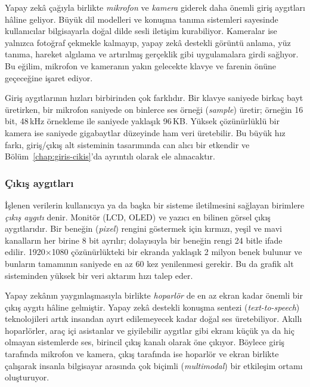 Yapay zekâ çağıyla birlikte \emph{mikrofon} ve \emph{kamera} giderek daha önemli giriş aygıtları hâline geliyor. Büyük dil modelleri ve konuşma tanıma sistemleri sayesinde kullanıcılar bilgisayarla doğal dilde sesli iletişim kurabiliyor. Kameralar ise yalnızca fotoğraf çekmekle kalmayıp, yapay zekâ destekli görüntü anlama, yüz tanıma, hareket algılama ve artırılmış gerçeklik gibi uygulamalara girdi sağlıyor. Bu eğilim, mikrofon ve kameranın yakın gelecekte klavye ve farenin önüne geçeceğine işaret ediyor.

Giriş aygıtlarının hızları birbirinden çok farklıdır. Bir klavye saniyede birkaç bayt üretirken, bir mikrofon saniyede on binlerce ses örneği (\emph{sample}) üretir; örneğin 16 bit, 48\,kHz örnekleme ile saniyede yaklaşık 96\,KB. Yüksek çözünürlüklü bir kamera ise saniyede gigabaytlar düzeyinde ham veri üretebilir. Bu büyük hız farkı, giriş/çıkış alt sisteminin tasarımında can alıcı bir etkendir ve Bölüm~\ref{chap:giris-cikis}'da ayrıntılı olarak ele alınacaktır.

\subsubsection*{Çıkış aygıtları}
İşlenen verilerin kullanıcıya ya da başka bir sisteme iletilmesini sağlayan birimlere \emph{çıkış aygıtı} denir. Monitör (LCD, OLED) ve yazıcı en bilinen görsel çıkış aygıtlarıdır. Bir beneğin (\emph{pixel}) rengini göstermek için kırmızı, yeşil ve mavi kanalların her birine 8 bit ayrılır; dolayısıyla bir beneğin rengi 24 bitle ifade edilir. 1920$\times$1080 çözünürlükteki bir ekranda yaklaşık 2 milyon benek bulunur ve bunların tamamının saniyede en az 60 kez yenilenmesi gerekir. Bu da grafik alt sisteminden yüksek bir veri aktarım hızı talep eder.

Yapay zekânın yaygınlaşmasıyla birlikte \emph{hoparlör} de en az ekran kadar önemli bir çıkış aygıtı hâline gelmiştir. Yapay zekâ destekli konuşma sentezi (\emph{text-to-speech}) teknolojileri artık insandan ayırt edilemeyecek kadar doğal ses üretebiliyor. Akıllı hoparlörler, araç içi asistanlar ve giyilebilir aygıtlar gibi ekranı küçük ya da hiç olmayan sistemlerde ses, birincil çıkış kanalı olarak öne çıkıyor. Böylece giriş tarafında mikrofon ve kamera, çıkış tarafında ise hoparlör ve ekran birlikte çalışarak insanla bilgisayar arasında çok biçimli (\emph{multimodal}) bir etkileşim ortamı oluşturuyor.

